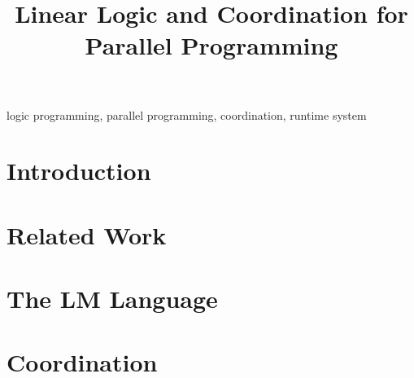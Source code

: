 \documentclass{sigplanconf}[9pt]
\begin{document}
\setlength{\pdfpageheight}{\paperheight}
\setlength{\pdfpagewidth}{\paperwidth}






\title{Linear Logic and Coordination for Parallel Programming}


\newcommand{\lang}[0]{LM }

\begin{abstract}

\end{abstract}


\keywords
logic programming, parallel programming, coordination, runtime system

\section{Introduction}


\section{Related Work}


\section{The \lang Language}


\section{Coordination}

\end{document}
